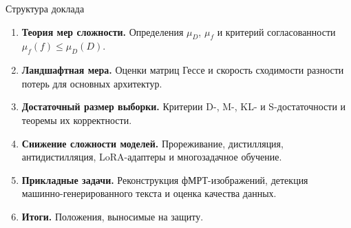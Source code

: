\documentclass[10pt,pdf,hyperref={unicode}]{beamer}
\begin{document}
\begin{frame}{Структура доклада}
\justifying
\small
\begin{enumerate}
    \item \textbf{Теория мер сложности.} Определения $\mu_D$, $\mu_f$ и критерий согласованности $\mu_f(f)\le\mu_D(D)$.
    \item \textbf{Ландшафтная мера.} Оценки матриц Гессе и скорость сходимости разности потерь для основных архитектур.
    \item \textbf{Достаточный размер выборки.} Критерии D-, M-, KL- и S-достаточности и теоремы их корректности.
    \item \textbf{Снижение сложности моделей.} Прореживание, дистилляция, антидистилляция, LoRA-адаптеры и многозадачное обучение.
    \item \textbf{Прикладные задачи.} Реконструкция фМРТ-изображений, детекция машинно-генерированного текста и оценка качества данных.
    \item \textbf{Итоги.} Положения, выносимые на защиту.
\end{enumerate}
\end{frame}
\end{document}
